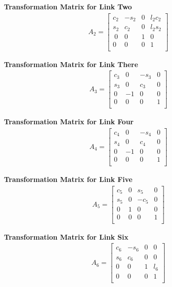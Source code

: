 \documentclass[fleqn,english,11pt,a4paper,landscape]{article}
\begin{document}
	\textbf{Transformation Matrix for Link Two}
	\begin{align*}
	A_2= \begin{bmatrix}
		 c_{2} & -s_{2} & 0 & l_2c_2\\
		 s_{2} & c_{2} & 0 & l_2s_2\\\
		 0 & 0 & 1 & 0\\
		 0 & 0 & 0 & 1\\
		\end{bmatrix}
	\end{align*}

	\textbf{Transformation Matrix for Link There}
	\begin{align*}
	A_3= \begin{bmatrix}
		 c_{3} & 0 & -s_{3} & 0\\
		 s_{3} & 0 & c_{3} & 0\\
		 0 & -1 & 0 & 0\\
		 0 & 0 & 0 & 1\\
		\end{bmatrix}
	\end{align*}

	\textbf{Transformation Matrix for Link Four}
	\begin{align*}
	A_4= \begin{bmatrix}
		 c_{4} & 0 & -s_{4} & 0\\
		 s_{4} & 0 & c_{4} & 0\\
		 0 & -1 & 0 & 0\\
		 0 & 0 & 0 & 1\\
		\end{bmatrix}
	\end{align*}

	\textbf{Transformation Matrix for Link Five}
	\begin{align*}
	A_5= \begin{bmatrix}
		 c_{5} & 0 & s_{5} & 0\\
		 s_{5} & 0 & -c_{5} & 0\\
		 0 & 1 & 0 & 0\\
		 0 & 0 & 0 & 1\\
		\end{bmatrix}
	\end{align*}

	\textbf{Transformation Matrix for Link Six}
	\begin{align*}
	A_6= \begin{bmatrix}
		 c_{6} & -s_{6} & 0 & 0\\
		 s_{6} & c_{6} & 0 & 0\\
		 0 & 0 & 1 & l_6\\
		 0 & 0 & 0 & 1\\
		\end{bmatrix}
	\end{align*}
\end{document}
